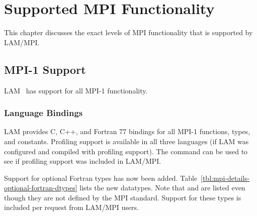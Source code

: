 %
% 
%
%

\chapter{Supported MPI Functionality}
\label{sec:mpi-functionality}

This chapter discusses the exact levels of MPI functionality that is
supported by LAM/MPI.


\section{MPI-1 Support}

LAM \lamversion\ has support for all MPI-1 functionality.


\subsection{Language Bindings}
\label{sec:mpi-details-mpi1-language}

LAM provides C, C++, and Fortran 77 bindings for all MPI-1 functions,
types, and constants.
%
Profiling support is available in all three languages (if LAM was
configured and compiled with profiling support).  The 
command can be used to see if profiling support was included in
LAM/MPI.


Support for optional Fortran types has now been added.
Table~\ref{tbl:mpi-details-optional-fortran-dtypes} lists the new
datatypes.  Note that  and
 are listed even though they are not
defined by the MPI standard.  Support for these types is included per
request from LAM/MPI users.

